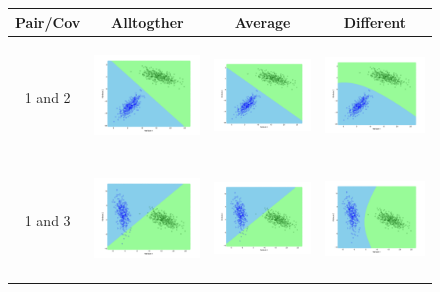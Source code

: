 \documentclass[a4paper]{article}
\begin{document}
			\begin{figure}
				\begin{tabular}{|c|c|c|c|}
					\hline
					Pair/Cov &  Alltogther & Average & Different	\\
					\hline
					1 and
					2&\includegraphics[width=40mm,height=30mm]{naivebayes/ls/pair/12/all_cov.png}&\includegraphics[width=40mm,height=30mm]{naivebayes/ls/pair/12/avg_cov.png}
					&\includegraphics[width=40mm,height=30mm]{naivebayes/ls/pair/12/diff_cov.png}\\
					\hline
					1 and
					3&\includegraphics[width=40mm,height=30mm]{naivebayes/ls/pair/13/all_cov.png}&\includegraphics[width=40mm,height=30mm]{naivebayes/ls/pair/13/all_cov.png}
					&\includegraphics[width=40mm,height=30mm]{naivebayes/ls/pair/13/diff_cov.png}\\

\end{tabular}
\end{figure}
\end{document}
